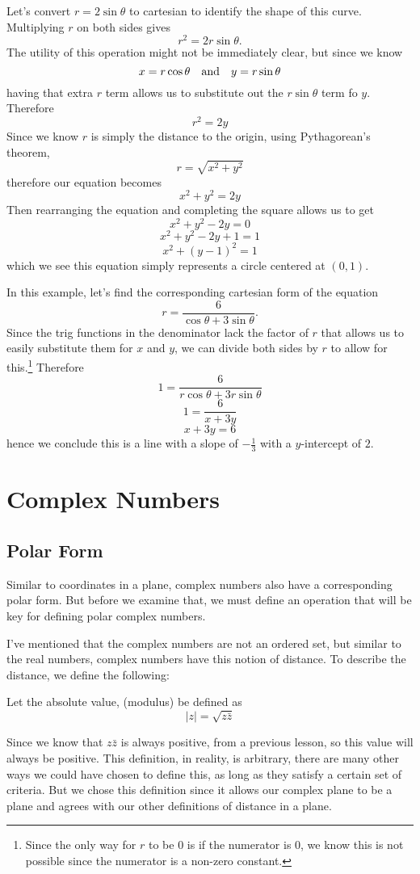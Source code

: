 \begin{ex}
	Let's convert $r=2\sin\theta$ to cartesian to identify the shape of this curve.
	Multiplying $r$ on both sides gives
	$$r^2=2r\sin\theta.$$
	The utility of this operation might not be immediately clear, but since we know
	$$x=r\cos\theta \quad\text{and}\quad y=r\sin\theta$$
	having that extra $r$ term allows us to substitute out the $r\sin\theta$ term fo $y$. Therefore
	$$r^2=2y$$
	Since we know $r$ is simply the distance to the origin, using Pythagorean's theorem,
	$$r=\sqrt{x^2+y^2}$$
	therefore our equation becomes
	$$x^2+y^2=2y$$
	Then rearranging the equation and completing the square allows us to get
	$$x^2+y^2-2y=0$$
	$$x^2+y^2-2y+1=1$$
	$$x^2+(y-1)^2=1$$
	which we see this equation simply represents a circle centered at $(0,1)$.
\end{ex}

\begin{ex}
	In this example, let's find the corresponding cartesian form of the equation
	$$r=\frac{6}{\cos\theta+3\sin\theta}.$$
	Since the trig functions in the denominator lack the factor of $r$ that allows us to easily substitute them for $x$ and $y$, we can divide both sides by $r$ to allow for this.\footnote{Since the only way for $r$ to be 0 is if the numerator is 0, we know this is not possible since the numerator is a non-zero constant.}
	Therefore
	$$1=\frac{6}{r\cos\theta+3r\sin\theta}$$
	$$1=\frac{6}{x+3y}$$
	$$x+3y=6$$
	hence we conclude this is a line with a slope of $-\frac{1}{3}$ with a $y$-intercept of $2$.
\end{ex}

\section{Complex Numbers}
\subsection{Polar Form}
Similar to coordinates in a plane, complex numbers also have a corresponding polar form. But before we examine that, we must define an operation that will be key for defining polar complex numbers.

I've mentioned that the complex numbers are not an ordered set, but similar to the real numbers, complex numbers have this notion of distance. To describe the distance, we define the following:
\begin{define}
	Let the absolute value, (modulus) be defined as
	$$|z|=\sqrt{z\bar{z}}$$
\end{define}
Since we know that $z\bar{z}$ is always positive, from a previous lesson, so this value will always be positive. 
This definition, in reality, is arbitrary, there are many other ways we could have chosen to define this, as long as they satisfy a certain set of criteria. But we chose this definition since it allows our complex plane to be a plane and agrees with our other definitions of distance in a plane.

